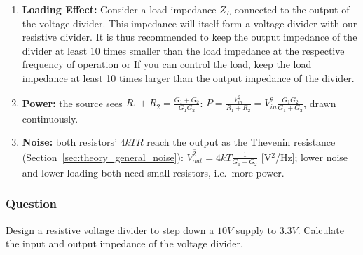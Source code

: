\begin{enumerate}
    \paragraph{At Output:} Looking in from \(V_{out}\) with both sources
    shorted (\(0V\)), \(G_1\) and \(G_2\) are both connected from \(V_{out}\)
    to ground, so they are in parallel and their conductances add:
      \begin{align*}
        Z_{out} &= \frac{1}{G_1 + G_2} \\
        Z_{out} &= \frac{1}{\frac{1}{R_1} + \frac{1}{R_2}} \hspace{1cm} \text{(Substituting \(G_1 = \frac{1}{R_1}\) and \(G_2 = \frac{1}{R_2}\))} \\
        Z_{out} &= \frac{1}{\frac{R_1 + R_2}{R_1 R_2}} \\
        Z_{out} &= \frac{R_1 R_2}{R_1 + R_2}
      \end{align*}
  \item \textbf{Loading Effect:}
    Consider a load impedance \(Z_L\) connected to the output of the voltage
    divider. This impedance will itself form a voltage divider with our
    resistive divider. It is thus recommended to keep the output impedance
    of the divider at least 10 times smaller than the load impedance at the
    respective frequency of operation or If you can control the load,
    keep the load impedance at least 10 times larger than the output
    impedance of the divider.
  \item \textbf{Power:} the source sees \(R_1 + R_2 = \frac{G_1 + G_2}{G_1G_2}\):
    \(P = \frac{V_{in}^2}{R_1 + R_2} = V_{in}^2\frac{G_1G_2}{G_1 + G_2}\), drawn continuously.
  \item \textbf{Noise:} both resistors' \(4kTR\) reach the output as the Thevenin resistance (Section~\ref{sec:theory_general_noise}):
    \(\overline{V_{out}^2} = 4kT\frac{1}{G_1 + G_2}\) [V\(^2\)/Hz]; lower noise and lower loading both need small resistors, i.e.\ more
    power.
\end{enumerate}

\subsubsection{Question}
Design a resistive voltage divider to step down a \(10V\) supply to
\(3.3V\). Calculate the input and output impedance of the voltage divider.

